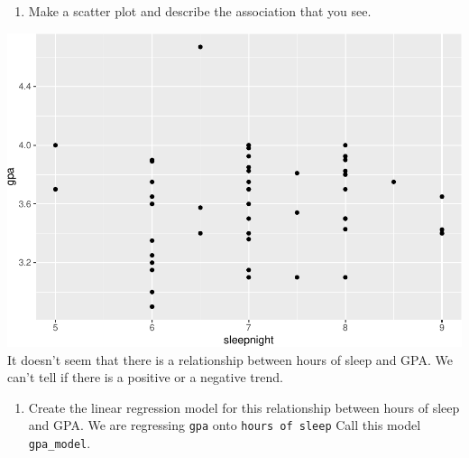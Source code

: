 \documentclass[]{article}
\newenvironment{Shaded}{\begin{snugshade}}{\end{snugshade}}
\newcommand{\DataTypeTok}[1]{\textcolor[rgb]{0.13,0.29,0.53}{#1}}
\newcommand{\KeywordTok}[1]{\textcolor[rgb]{0.13,0.29,0.53}{\textbf{#1}}}
\newcommand{\NormalTok}[1]{#1}
\newcommand{\OperatorTok}[1]{\textcolor[rgb]{0.81,0.36,0.00}{\textbf{#1}}}
\newcommand{\StringTok}[1]{\textcolor[rgb]{0.31,0.60,0.02}{#1}}
\providecommand{\tightlist}{%
  \setlength{\itemsep}{0pt}\setlength{\parskip}{0pt}}
\begin{document}
\begin{enumerate}
\def\labelenumi{\arabic{enumi}.}
\setcounter{enumi}{1}
\tightlist
\item
  Make a scatter plot and describe the association that you see.
\end{enumerate}

\begin{Shaded}
\end{Shaded}

\includegraphics{lab-8-regression_files/figure-latex/unnamed-chunk-3-1.pdf}
It doesn't seem that there is a relationship between hours of sleep and
GPA. We can't tell if there is a positive or a negative trend.

\begin{enumerate}
\def\labelenumi{\arabic{enumi}.}
\setcounter{enumi}{2}
\tightlist
\item
  Create the linear regression model for this relationship between hours
  of sleep and GPA. We are regressing \texttt{gpa} onto
  \texttt{hours\ of\ sleep} Call this model \texttt{gpa\_model}.
\end{enumerate}

\begin{Shaded}
\end{Shaded}
\end{document}
